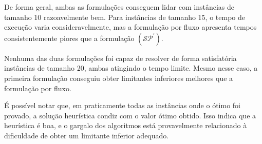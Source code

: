 \documentclass{article}
\begin{document}
De forma geral, ambas as formulações conseguem lidar com instâncias de tamanho 10 razoavelmente bem. Para instâncias de tamanho 15, o tempo de execução varia consideravelmente, mas a formulação por fluxo apresenta tempos consistentemente piores que a formulação $(\mathcal{SP}^\prime)$.

Nenhuma das duas formulações foi capaz de resolver de forma satisfatória instâncias de tamanho 20, ambas atingindo o tempo limite. Mesmo nesse caso, a primeira formulação conseguiu obter limitantes inferiores melhores que a formulação por fluxo.

É possível notar que, em praticamente todas as instâncias onde o ótimo foi provado, a solução heurística condiz com o valor ótimo obtido. Isso indica que a heurística é boa, e o gargalo dos algoritmos está provavelmente relacionado à dificuldade de obter um limitante inferior adequado.



\end{document}
